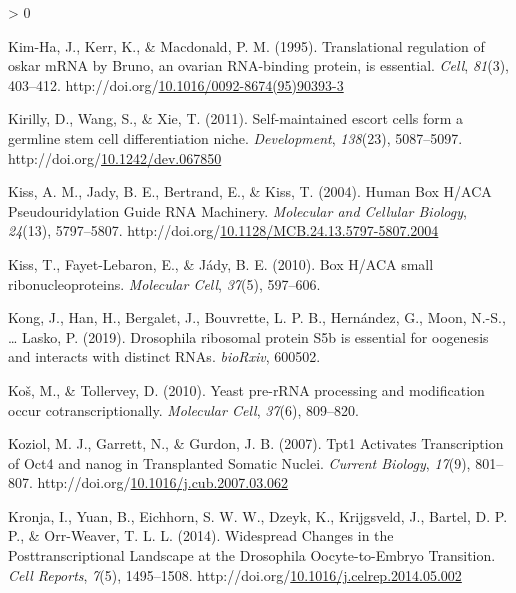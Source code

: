 \documentclass[12pt,oneside]{reedthesis}
\newlength{\cslhangindent}
\newenvironment{CSLReferences}[2] %
 {%
  \setlength{\parindent}{0pt}
  \ifodd #1 \everypar{\setlength{\hangindent}{\cslhangindent}}\ignorespaces\fi
  \ifnum #2 > 0
  \setlength{\parskip}{#2\baselineskip}
  \fi
 }%
 {}
\begin{document}
\begin{CSLReferences}{1}{0}
\leavevmode\hypertarget{ref-Kim-Ha1995i}{}%
Kim-Ha, J., Kerr, K., \& Macdonald, P. M. (1995). Translational regulation of oskar {mRNA} by {Bruno}, an ovarian {RNA-binding} protein, is essential. \emph{Cell}, \emph{81}(3), 403--412. http://doi.org/\href{https://doi.org/10.1016/0092-8674(95)90393-3}{10.1016/0092-8674(95)90393-3}

\leavevmode\hypertarget{ref-kirillySelfmaintainedEscortCells2011}{}%
Kirilly, D., Wang, S., \& Xie, T. (2011). Self-maintained escort cells form a germline stem cell differentiation niche. \emph{Development}, \emph{138}(23), 5087--5097. http://doi.org/\href{https://doi.org/10.1242/dev.067850}{10.1242/dev.067850}

\leavevmode\hypertarget{ref-Kiss2004c}{}%
Kiss, A. M., Jady, B. E., Bertrand, E., \& Kiss, T. (2004). Human {Box H}/{ACA Pseudouridylation Guide RNA Machinery}. \emph{Molecular and Cellular Biology}, \emph{24}(13), 5797--5807. http://doi.org/\href{https://doi.org/10.1128/MCB.24.13.5797-5807.2004}{10.1128/MCB.24.13.5797-5807.2004}

\leavevmode\hypertarget{ref-Kiss2010}{}%
Kiss, T., Fayet-Lebaron, E., \& Jády, B. E. (2010). Box {H}/{ACA} small ribonucleoproteins. \emph{Molecular Cell}, \emph{37}(5), 597--606.

\leavevmode\hypertarget{ref-Kong2019}{}%
Kong, J., Han, H., Bergalet, J., Bouvrette, L. P. B., Hernández, G., Moon, N.-S., \ldots{} Lasko, P. (2019). Drosophila ribosomal protein {S5b} is essential for oogenesis and interacts with distinct {RNAs}. \emph{bioRxiv}, 600502.

\leavevmode\hypertarget{ref-Kos2010}{}%
Koš, M., \& Tollervey, D. (2010). Yeast pre-{rRNA} processing and modification occur cotranscriptionally. \emph{Molecular Cell}, \emph{37}(6), 809--820.

\leavevmode\hypertarget{ref-koziolTpt1ActivatesTranscription2007}{}%
Koziol, M. J., Garrett, N., \& Gurdon, J. B. (2007). Tpt1 {Activates Transcription} of Oct4 and nanog in {Transplanted Somatic Nuclei}. \emph{Current Biology}, \emph{17}(9), 801--807. http://doi.org/\href{https://doi.org/10.1016/j.cub.2007.03.062}{10.1016/j.cub.2007.03.062}

\leavevmode\hypertarget{ref-Kronja2014}{}%
Kronja, I., Yuan, B., Eichhorn, S. W. W., Dzeyk, K., Krijgsveld, J., Bartel, D. P. P., \& Orr-Weaver, T. L. L. (2014). Widespread {Changes} in the {Posttranscriptional Landscape} at the {Drosophila Oocyte-to-Embryo Transition}. \emph{Cell Reports}, \emph{7}(5), 1495--1508. http://doi.org/\href{https://doi.org/10.1016/j.celrep.2014.05.002}{10.1016/j.celrep.2014.05.002}


\end{CSLReferences}
\end{document}
